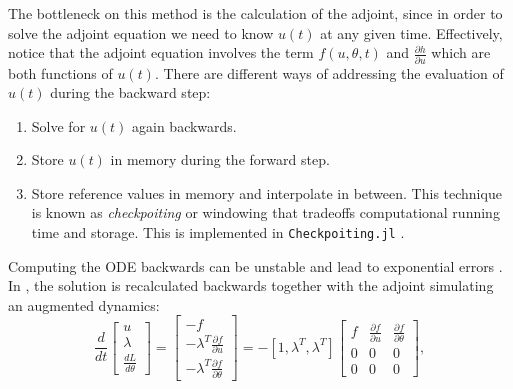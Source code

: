 The bottleneck on this method is the calculation of the adjoint, since in order to solve the adjoint equation we need to know $u(t)$ at any given time. 
Effectively, notice that the adjoint equation involves the term $f(u, \theta, t)$ and $\frac{\partial h}{\partial u}$ which are both functions of $u(t)$. 
There are different ways of addressing the evaluation of $u(t)$ during the backward step:
\begin{enumerate}[label=(\roman*)]
    \item Solve for $u(t)$ again backwards.
    \item Store $u(t)$ in memory during the forward step.
    \item Store reference values in memory and interpolate in between. 
    This technique is known as \textit{checkpoiting} or windowing that tradeoffs computational running time and storage.
    This is implemented in \texttt{Checkpoiting.jl} \cite{Checkpoiting_2023}.
\end{enumerate} 
Computing the ODE backwards can be unstable and lead to exponential errors \cite{kim_stiff_2021}. 
In \cite{chen_neural_2019}, the solution is recalculated backwards together with the adjoint simulating an augmented dynamics: 
\begin{equation}
    \frac{d}{dt}
    \begin{bmatrix}
       u \\
       \lambda \\
       \frac{dL}{d\theta}
    \end{bmatrix}
    = 
    \begin{bmatrix}
       -f \\
       - \lambda^T \frac{\partial f}{\partial u} \\
       - \lambda^T \frac{\partial f}{\partial \theta}
    \end{bmatrix}
    = 
    - [ 1, \lambda^T, \lambda^T ]
    \begin{bmatrix}
       f & \frac{\partial f}{\partial u} & \frac{\partial f}{\partial \theta} \\
       0 & 0 & 0 \\
       0 & 0 & 0
    \end{bmatrix},
\end{equation}
